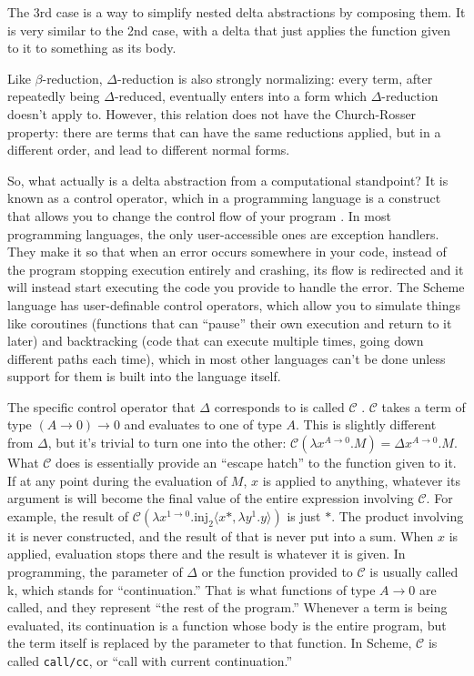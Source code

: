 \documentclass[12pt]{article}
\begin{document}
The 3rd case is a way to simplify nested delta abstractions by composing them. It is very similar to the 2nd case, with a delta that just applies the function given to it to something as its body.

Like $\beta$-reduction, $\Delta$-reduction is also strongly normalizing: every term, after repeatedly being $\Delta$-reduced, eventually enters into a form which $\Delta$-reduction doesn't apply to. However, this relation does not have the Church-Rosser property: there are terms that can have the same reductions applied, but in a different order, and lead to different normal forms.

So, what actually is a delta abstraction from a computational standpoint? It is known as a control operator, which in a programming language is a construct that allows you to change the control flow of your program \cite{sorensen}. In most programming languages, the only user-accessible ones are exception handlers. They make it so that when an error occurs somewhere in your code, instead of the program stopping execution entirely and crashing, its flow is redirected and it will instead start executing the code you provide to handle the error. The Scheme language has user-definable control operators, which allow you to simulate things like coroutines (functions that can ``pause'' their own execution and return to it later) and backtracking (code that can execute multiple times, going down different paths each time), which in most other languages can't be done unless support for them is built into the language itself.

The specific control operator that $\Delta$ corresponds to is called $\mathcal{C}$ \cite{griffin}. $\mathcal{C}$ takes a term of type $(A \to 0) \to 0$ and evaluates to one of type $A$. This is slightly different from $\Delta$, but it's trivial to turn one into the other: $\mathcal{C}(\lambda x^{A \to 0}.M) = \Delta x^{A \to 0}.M$. What $\mathcal{C}$ does is essentially provide an ``escape hatch'' to the function given to it. If at any point during the evaluation of $M$, $x$ is applied to anything, whatever its argument is will become the final value of the entire expression involving $\mathcal{C}$. For example, the result of $\mathcal{C}(\lambda x^{1 \to 0}. \text{inj}_2 \langle x *, \lambda y^1. y \rangle)$ is just $*$. The product involving it is never constructed, and the result of that is never put into a sum. When $x$ is applied, evaluation stops there and the result is whatever it is given. In programming, the parameter of $\Delta$ or the function provided to $\mathcal{C}$ is usually called k, which stands for ``continuation.'' That is what functions of type $A \to 0$ are called, and they represent ``the rest of the program.'' Whenever a term is being evaluated, its continuation is a function whose body is the entire program, but the term itself is replaced by the parameter to that function. In Scheme, $\mathcal{C}$ is called \texttt{call/cc}, or ``call with current continuation.''
\end{document}
